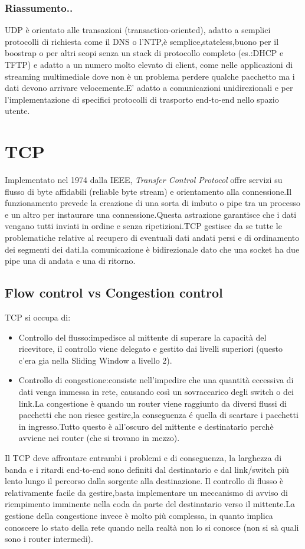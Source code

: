 \subsubsection{Riassumento..}
UDP è orientato alle transazioni (transaction-oriented), adatto a semplici protocolli di richiesta come il DNS o l'NTP,è semplice,stateless,buono per il boostrap o per altri scopi senza un stack di protocollo completo (es.:DHCP e TFTP) e adatto a un numero molto elevato di client, come nelle applicazioni di streaming multimediale dove non è un problema perdere qualche pacchetto ma i dati devono arrivare velocemente.E' adatto a comunicazioni unidirezionali e per l'implementazione di specifici protocolli di trasporto end-to-end nello spazio utente.
\section{TCP}
Implementato nel 1974 dalla IEEE, \textit{Transfer Control Protocol} offre servizi su flusso di byte affidabili (reliable byte stream) e orientamento alla connessione.Il funzionamento prevede la creazione di una sorta di imbuto o pipe tra un processo e un altro per instaurare una connessione.Questa astrazione garantisce che i dati vengano tutti inviati in ordine e senza ripetizioni.TCP gestisce da se tutte le problematiche relative al recupero di eventuali dati andati persi e di ordinamento dei segmenti dei dati.la comunicazione è bidirezionale dato che una socket ha due pipe una di andata e una di ritorno.
\subsection{Flow control vs Congestion control}
TCP si occupa di:
\begin{itemize}
  \item Controllo del flusso:impedisce al mittente di superare la capacità del ricevitore, il controllo viene delegato e gestito dai livelli superiori (questo c'era gia nella Sliding Window a livello 2).
  \item Controllo di congestione:consiste nell'impedire che una quantità eccessiva di dati venga immessa in rete, causando così un sovraccarico degli switch o dei link.La congestione è quando un router viene raggiunto da diversi flussi di pacchetti che non riesce gestire,la conseguenza é quella di scartare i pacchetti in ingresso.Tutto questo è all'oscuro del mittente e destinatario perchè avviene nei router (che si trovano in mezzo).
\end{itemize}
Il TCP deve affrontare entrambi i problemi e di conseguenza, la larghezza di banda e i ritardi end-to-end sono definiti dal destinatario e dal link/switch più lento lungo il percorso dalla sorgente alla destinazione. Il controllo di flusso è relativamente facile da gestire,basta implementare un meccanismo di avviso di riempimento imminente nella coda da parte del destinatario verso il mittente.La gestione della congestione invece è molto più complessa, in quanto implica conoscere lo stato della rete quando nella realtà non lo si conosce (non si sà quali sono i router intermedi).
